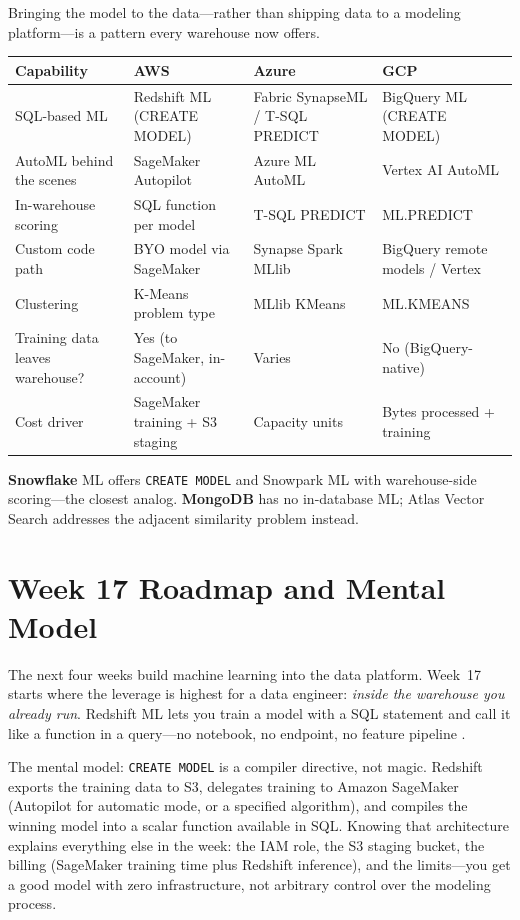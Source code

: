 \begin{crosscloud}
Bringing the model to the data---rather than shipping data to a modeling platform---is a pattern every warehouse now offers.

\vspace{2mm}
{\footnotesize
\begin{tabular}{@{}p{2.8cm}p{3.0cm}p{3.0cm}p{3.0cm}@{}}
\toprule
\textbf{Capability} & \textbf{AWS} & \textbf{Azure} & \textbf{GCP} \\
\midrule
SQL-based ML & Redshift ML (CREATE MODEL) & Fabric SynapseML / T-SQL PREDICT & BigQuery ML (CREATE MODEL) \\
AutoML behind the scenes & SageMaker Autopilot & Azure ML AutoML & Vertex AI AutoML \\
In-warehouse scoring & SQL function per model & T-SQL PREDICT & ML.PREDICT \\
Custom code path & BYO model via SageMaker & Synapse Spark MLlib & BigQuery remote models / Vertex \\
Clustering & K-Means problem type & MLlib KMeans & ML.KMEANS \\
\addlinespace
Training data leaves warehouse? & Yes (to SageMaker, in-account) & Varies & No (BigQuery-native) \\
Cost driver & SageMaker training + S3 staging & Capacity units & Bytes processed + training \\
\bottomrule
\end{tabular}}

\vspace{1mm}
\textbf{Snowflake} ML offers \texttt{CREATE MODEL} and Snowpark ML with warehouse-side scoring---the closest analog. \textbf{MongoDB} has no in-database ML; Atlas Vector Search addresses the adjacent similarity problem instead.
\end{crosscloud}

\section{Week 17 Roadmap and Mental Model}
The next four weeks build machine learning into the data platform. Week~17 starts where the leverage is highest for a data engineer: \emph{inside the warehouse you already run}. Redshift ML lets you train a model with a SQL statement and call it like a function in a query---no notebook, no endpoint, no feature pipeline \cite{awsRedshiftMLDocs}.

The mental model: \texttt{CREATE MODEL} is a compiler directive, not magic. Redshift exports the training data to S3, delegates training to Amazon SageMaker (Autopilot for automatic mode, or a specified algorithm), and compiles the winning model into a scalar function available in SQL. Knowing that architecture explains everything else in the week: the IAM role, the S3 staging bucket, the billing (SageMaker training time plus Redshift inference), and the limits---you get a good model with zero infrastructure, not arbitrary control over the modeling process.


